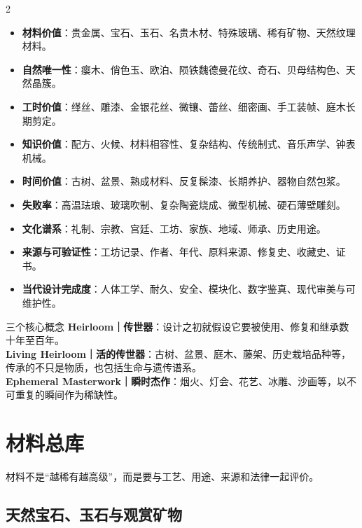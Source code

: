 \documentclass[lang=en,a4paper,11pt]{elegantpaper}
\newcommand{\craft}[1]{\textbf{#1}}
\begin{document}
\begin{multicols}{2}
\begin{itemize}
\item \craft{材料价值}：贵金属、宝石、玉石、名贵木材、特殊玻璃、稀有矿物、天然纹理材料。
\item \craft{自然唯一性}：瘿木、俏色玉、欧泊、陨铁魏德曼花纹、奇石、贝母结构色、天然晶簇。
\item \craft{工时价值}：缂丝、雕漆、金银花丝、微镶、蕾丝、细密画、手工装帧、庭木长期剪定。
\item \craft{知识价值}：配方、火候、材料相容性、复杂结构、传统制式、音乐声学、钟表机械。
\item \craft{时间价值}：古树、盆景、熟成材料、反复髹漆、长期养护、器物自然包浆。
\item \craft{失败率}：高温珐琅、玻璃吹制、复杂陶瓷烧成、微型机械、硬石薄壁雕刻。
\item \craft{文化谱系}：礼制、宗教、宫廷、工坊、家族、地域、师承、历史用途。
\item \craft{来源与可验证性}：工坊记录、作者、年代、原料来源、修复史、收藏史、证书。
\item \craft{当代设计完成度}：人体工学、耐久、安全、模块化、数字鉴真、现代审美与可维护性。
\end{itemize}
\end{multicols}

\begin{catalogbox}{三个核心概念}
\textbf{Heirloom｜传世器}：设计之初就假设它要被使用、修复和继承数十年至百年。\\
\textbf{Living Heirloom｜活的传世器}：古树、盆景、庭木、藤架、历史栽培品种等，传承的不只是物质，也包括生命与遗传谱系。\\
\textbf{Ephemeral Masterwork｜瞬时杰作}：烟火、灯会、花艺、冰雕、沙画等，以不可重复的瞬间作为稀缺性。
\end{catalogbox}

\section{材料总库}
材料不是“越稀有越高级”，而是要与工艺、用途、来源和法律一起评价。

\subsection{天然宝石、玉石与观赏矿物}
\end{document}

